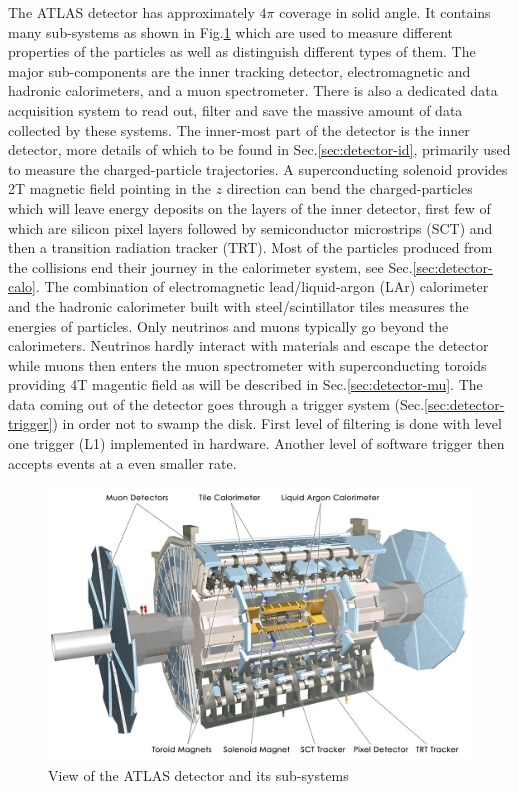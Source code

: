 The ATLAS detector has approximately $4\pi$ coverage in solid angle. It contains many sub-systems as shown in Fig.\ref{fig:detector-atlas} which are used to measure different properties of the particles as well as distinguish different types of them. The major sub-components are the inner tracking detector, electromagnetic and hadronic calorimeters, and a muon spectrometer. There is also a dedicated data acquisition system to read out, filter and save the massive amount of data collected by these systems. The inner-most part of the detector is the inner detector, more details of which to be found in Sec.\ref{sec:detector-id}, primarily used to measure the charged-particle trajectories. A superconducting solenoid provides 2T magnetic field pointing in the $z$ direction can bend the charged-particles which will leave energy deposits on the layers of the inner detector, first few of which are silicon pixel layers followed by semiconductor microstrips (SCT) and then a transition radiation tracker (TRT). Most of the particles produced from the collisions end their journey in the calorimeter system, see Sec.\ref{sec:detector-calo}. The combination of electromagnetic lead/liquid-argon (LAr) calorimeter and the hadronic calorimeter built with steel/scintillator tiles measures the energies of particles. Only neutrinos and muons typically go beyond the calorimeters. Neutrinos hardly interact with materials and escape the detector while muons then enters the muon spectrometer with superconducting toroids providing 4T magentic field as will be described in Sec.\ref{sec:detector-mu}. The data coming out of the detector goes through a trigger system (Sec.\ref{sec:detector-trigger}) in order not to swamp the disk. First level of filtering is done with level one trigger (L1) implemented in hardware. Another level of software trigger then accepts events at a even smaller rate. 


\begin{figure}[htpb!]
\begin{center}
  \includegraphics[width=0.85\linewidth]{figures/detector/ATLAS_Silver_White_MK}
\caption{View of the ATLAS detector and its sub-systems}
\label{fig:detector-atlas}
\end{center}
\end{figure}


